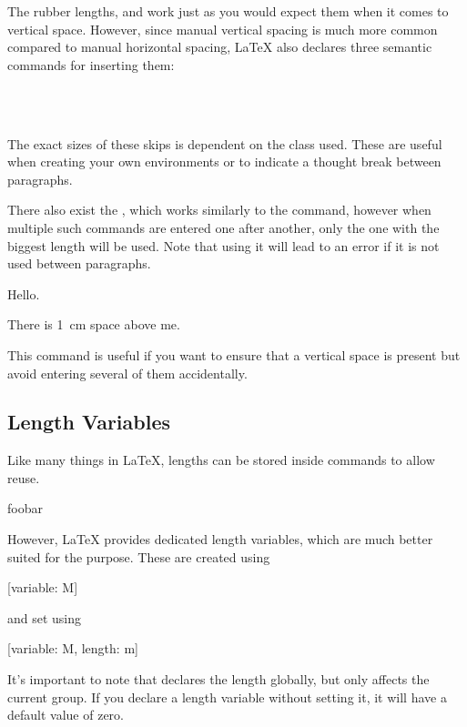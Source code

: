 The rubber lengths,  and  work just as you would expect
them when it comes to vertical space. However, since manual vertical spacing is
much more common compared to manual horizontal spacing, \LaTeX{} also declares
three semantic commands for inserting them:
\begin{lscommand}
   \\
   \\
\end{lscommand}
The exact sizes of these skips is dependent on the class used. These are useful
when creating your own environments or to indicate a thought break
between paragraphs.

There also exist the , which works similarly to the
 command, however when multiple such commands are entered one after
another, only the one with the biggest length will be used. Note that using it
will lead to an error if it is not used between paragraphs.
\begin{example}
Hello.

\addvspace{1pt}
\addvspace{1em}
\addvspace{1cm}
There is \qty{1}{\cm} space
above me.
\end{example}
This command is useful if you want to ensure that a vertical space is present
but avoid entering several of them accidentally.

\subsection{Length Variables}

Like many things in \LaTeX, lengths can be stored inside commands to allow
reuse.
\begin{example}
\NewDocumentCommand{%
  \mylength}{}{2em}
foo\hspace{\mylength}bar
\end{example}
However, \LaTeX{} provides dedicated length variables, which are much better
suited for the purpose. These are created using
\begin{lscommand}
  [variable: M]
\end{lscommand}
and set using
\begin{lscommand}
  [variable: M, length: m]
\end{lscommand}
It's important to note that  declares the length globally, but
 only affects the current group. If you declare a length
variable without setting it, it will have a default value of zero.

